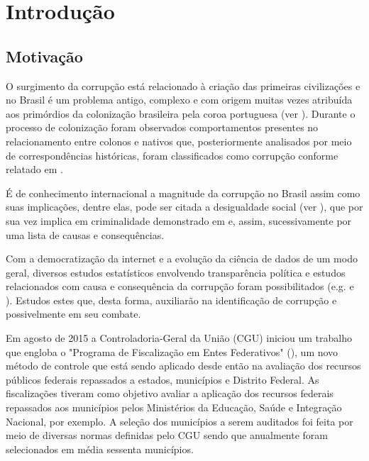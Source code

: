 \chapter{Introdução}
\label{cap:introducao}

\section{Motivação}
\label{sec:motivacao}

O surgimento da corrupção está relacionado à criação das primeiras civilizações e no Brasil é um problema antigo, complexo e com origem muitas vezes atribuída aos primórdios da colonização brasileira pela coroa portuguesa (ver \citet{LeiteMacedo2017}). Durante o processo de colonização foram observados comportamentos presentes no relacionamento entre colonos e nativos que, posteriormente analisados por meio de correspondências históricas, foram classificados como corrupção conforme relatado em \citet{LeiteMacedo2017}.

É de conhecimento internacional a magnitude da corrupção no Brasil assim como suas implicações, dentre elas, pode ser citada a desigualdade social (ver \citet{Alves2018}), que por sua vez implica em criminalidade demonstrado em \citet{ResendeAndrade2018} e, assim, sucessivamente por uma lista de causas e consequências.

Com a democratização da internet e a evolução da ciência de dados de um modo geral, diversos estudos estatísticos envolvendo transparência política e estudos relacionados com causa e consequência da corrupção foram possibilitados (e.g. \citet{FerrazFinan2008} e \citet{Ransom2013:MSc}). Estudos estes que, desta forma, auxiliarão na identificação de corrupção e possivelmente em seu combate.

Em agosto de 2015 a Controladoria-Geral da União (CGU) iniciou um trabalho que engloba o "Programa de Fiscalização em Entes Federativos" (\cite{CGU}), um novo método de controle que está sendo aplicado desde então na avaliação dos recursos públicos federais repassados a estados, municípios e Distrito Federal. As fiscalizações tiveram como objetivo avaliar a aplicação dos recursos federais repassados aos municípios pelos Ministérios da Educação, Saúde e Integração Nacional, por exemplo. A seleção dos municípios a serem auditados foi feita por meio de diversas normas definidas pelo CGU sendo que anualmente foram selecionados em média sessenta municípios.

